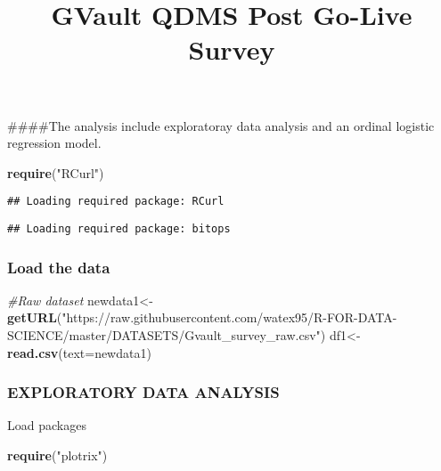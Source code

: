 \documentclass[
]{article}
\title{GVault QDMS Post Go-Live Survey}
\author{}
\date{\vspace{-2.5em}}
\newenvironment{Shaded}{\begin{snugshade}}{\end{snugshade}}
\newcommand{\CommentTok}[1]{\textcolor[rgb]{0.56,0.35,0.01}{\textit{#1}}}
\newcommand{\DataTypeTok}[1]{\textcolor[rgb]{0.13,0.29,0.53}{#1}}
\newcommand{\KeywordTok}[1]{\textcolor[rgb]{0.13,0.29,0.53}{\textbf{#1}}}
\newcommand{\NormalTok}[1]{#1}
\newcommand{\StringTok}[1]{\textcolor[rgb]{0.31,0.60,0.02}{#1}}
\begin{document}
\maketitle

\#\#\#\#The analysis include exploratoray data analysis and an ordinal
logistic regression model.

\begin{Shaded}
\begin{Highlighting}[]
\KeywordTok{require}\NormalTok{(}\StringTok{"RCurl"}\NormalTok{)}
\end{Highlighting}
\end{Shaded}

\begin{verbatim}
## Loading required package: RCurl
\end{verbatim}

\begin{verbatim}
## Loading required package: bitops
\end{verbatim}

\hypertarget{load-the-data}{%
\subsubsection{Load the data}\label{load-the-data}}

\begin{Shaded}
\begin{Highlighting}[]
\CommentTok{#Raw dataset}
\NormalTok{newdata1<-}\KeywordTok{getURL}\NormalTok{(}\StringTok{"https://raw.githubusercontent.com/watex95/R-FOR-DATA-SCIENCE/master/DATASETS/Gvault_survey_raw.csv"}\NormalTok{)}
\NormalTok{df1<-}\KeywordTok{read.csv}\NormalTok{(}\DataTypeTok{text=}\NormalTok{newdata1)}
\end{Highlighting}
\end{Shaded}

\hypertarget{exploratory-data-analysis}{%
\subsubsection{EXPLORATORY DATA
ANALYSIS}\label{exploratory-data-analysis}}

Load packages

\begin{Shaded}
\begin{Highlighting}[]
\KeywordTok{require}\NormalTok{(}\StringTok{"plotrix"}\NormalTok{)}
\end{Highlighting}
\end{Shaded}
\end{document}
